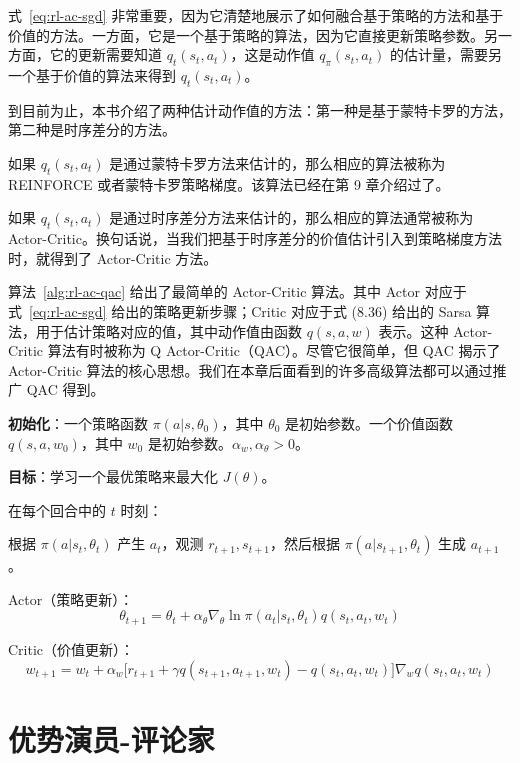 式~\eqref{eq:rl-ac-sgd} 非常重要，因为它清楚地展示了如何融合基于策略的方法和基于价值的方法。一方面，它是一个基于策略的算法，因为它直接更新策略参数。另一方面，它的更新需要知道 $q_{t}(s_{t}, a_{t})$，这是动作值 $q_{\pi}(s_{t}, a_{t})$ 的估计量，需要另一个基于价值的算法来得到 $q_{t}(s_{t}, a_{t})$。

到目前为止，本书介绍了两种估计动作值的方法：第一种是基于蒙特卡罗的方法，第二种是时序差分的方法。

如果 $q_{t}(s_{t}, a_{t})$ 是通过蒙特卡罗方法来估计的，那么相应的算法被称为 REINFORCE 或者蒙特卡罗策略梯度。该算法已经在第 9 章介绍过了。

如果 $q_{t}(s_{t}, a_{t})$ 是通过时序差分方法来估计的，那么相应的算法通常被称为 Actor-Critic。换句话说，当我们把基于时序差分的价值估计引入到策略梯度方法时，就得到了 Actor-Critic 方法。

算法~\ref{alg:rl-ac-qac} 给出了最简单的 Actor-Critic 算法。其中 Actor 对应于式~\eqref{eq:rl-ac-sgd} 给出的策略更新步骤；Critic 对应于式 (8.36) 给出的 Sarsa 算法，用于估计策略对应的值，其中动作值由函数 $q(s, a, w)$ 表示。这种 Actor-Critic 算法有时被称为 Q Actor-Critic（QAC）。尽管它很简单，但 QAC 揭示了 Actor-Critic 算法的核心思想。我们在本章后面看到的许多高级算法都可以通过推广 QAC 得到。

\begin{algo}\label{alg:rl-ac-qac}
\textbf{初始化}：一个策略函数 $\pi(a | s, \theta_{0})$，其中 $\theta_{0}$ 是初始参数。一个价值函数 $q(s, a, w_{0})$，其中 $w_{0}$ 是初始参数。$\alpha_{w}, \alpha_{\theta} > 0$。

\textbf{目标}：学习一个最优策略来最大化 $J(\theta)$。

在每个回合中的 $t$ 时刻：

\quad 根据 $\pi(a | s_{t}, \theta_{t})$ 产生 $a_{t}$，观测 $r_{t+1}, s_{t+1}$，然后根据 $\pi(a | s_{t+1}, \theta_{t})$ 生成 $a_{t+1}$。

\quad Actor（策略更新）：
\[
\theta_{t+1} = \theta_{t} + \alpha_{\theta} \nabla_{\theta} \ln \pi(a_{t} | s_{t}, \theta_{t}) q(s_{t}, a_{t}, w_{t})
\]

\quad Critic（价值更新）：
\[
w_{t+1} = w_{t} + \alpha_{w} \big[ r_{t+1} + \gamma q(s_{t+1}, a_{t+1}, w_{t}) - q(s_{t}, a_{t}, w_{t}) \big] \nabla_{w} q(s_{t}, a_{t}, w_{t})
\]
\end{algo}

\section{优势演员-评论家}
\label{sec:rl-ac-a2c}

